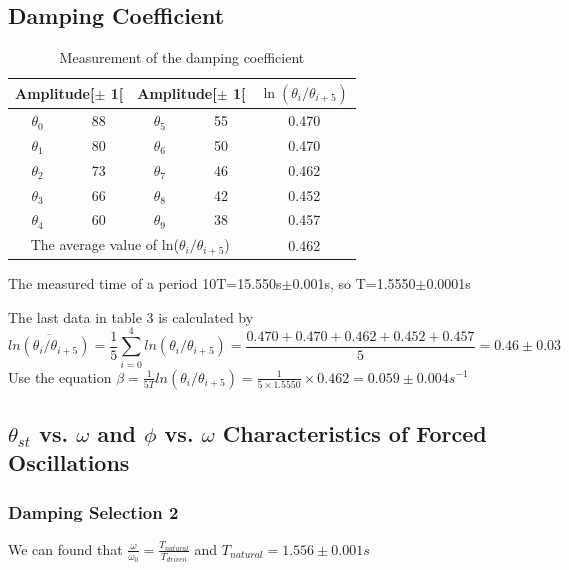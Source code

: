 \documentclass[12pt,a4paper]{article}
\begin{document}
\subsection{Damping Coefficient}
\begin{table}[h]
    \centering
    \begin{tabular}{|c|c|c|c|c|}
    \hline
    \multicolumn{2}{|c|}{Amplitude{[}\textdegree{]}$\pm$ 1{[}\textdegree{]}} & \multicolumn{2}{c|}{Amplitude{[}\textdegree{]}$\pm$ 1{[}\textdegree{]}} & $\ln{(\theta_i/\theta_{i+5})}$ \\ \hline
    $ \theta_0 $& 88   & $ \theta_5   $& 55 & 0.470
    \\ \hline
    $ \theta_1 $& 80   & $  \theta_6   $    & 50 & 0.470
    \\ \hline
    $ \theta_2  $& 73   & $  \theta_7     $  & 46 & 0.462
    \\ \hline
    $ \theta_3   $    & 66   & $    \theta_8   $  & 42 & 0.452
    \\ \hline
    $ \theta_4   $    & 60   & $ \theta_9     $   & 38 & 0.457
    \\ \hline
    \multicolumn{4}{|c|}{The average value of ln($\theta_i/\theta_{i+5}$)}& 0.462
    \\ \hline
    \end{tabular}
    \caption{Measurement of the damping coefficient}
\end{table}

The measured time of a period 10T=15.550s$\pm$0.001s, so T=1.5550$\pm$0.0001s \par 
The last data in table 3 is calculated by
$$\overline{ln(\theta_i/\theta_{i+5})}=\frac{1}{5}\sum^4_{i=0}ln(\theta_i/\theta_{i+5})=\frac{0.470+0.470+0.462+0.452+0.457}{5}=0.46\pm 0.03$$
Use the equation $\beta=\frac{1}{5T}ln(\theta_i/\theta_{i+5})=\frac{1}{5\times 1.5550}\times 0.462=0.059\pm 0.004s^{-1}$

\subsection{$\theta_{st}$ vs. $\omega$ and $\phi$ vs. $\omega$ Characteristics of Forced Oscillations}

\subsubsection{Damping Selection 2}

We can found that $\frac{\omega}{\omega_0}=\frac{T_{natural}}{T_{driven}}$ and $T_{natural}=1.556\pm0.001s$
\end{document}

